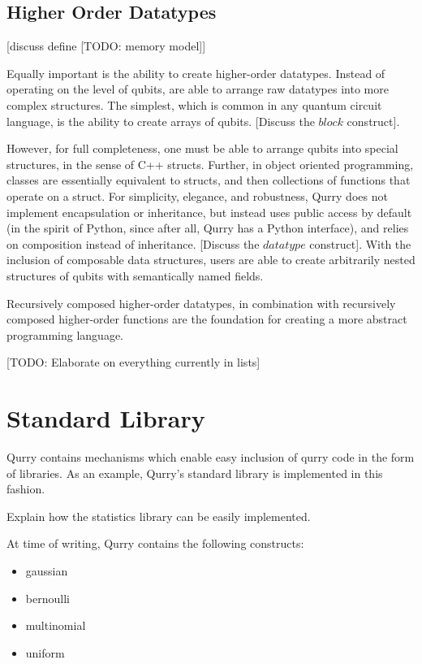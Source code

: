 \documentclass[journal]{IEEEtran}
\begin{document}
    \subsection{Higher Order Datatypes}

    [discuss define [TODO: memory model]]

    Equally important is the ability to create higher-order datatypes.
    Instead of operating on the level of qubits, are able to arrange raw datatypes into more complex structures.
    The simplest, which is common in any quantum circuit language, is the ability to create arrays of qubits.
    [Discuss the $block$ construct].

    However, for full completeness, one must be able to arrange qubits into special structures, in the sense of C++ structs.
    Further, in object oriented programming, classes are essentially equivalent to structs, and then collections of functions that operate on a struct.
    For simplicity, elegance, and robustness, Qurry does not implement encapsulation or inheritance, but instead uses public access by default (in the spirit of Python, since after all, Qurry has a Python interface), and relies on composition instead of inheritance.
    [Discuss the $datatype$ construct].
    With the inclusion of composable data structures, users are able to create arbitrarily nested structures of qubits with semantically named fields.

    Recursively composed higher-order datatypes, in combination with recursively composed higher-order functions are the foundation for creating a more abstract programming language.

    [TODO: Elaborate on everything currently in lists]

\section{Standard Library}

    Qurry contains mechanisms which enable easy inclusion of qurry code in the form of libraries.
    As an example, Qurry's standard library is implemented in this fashion.

    Explain how the statistics library can be easily implemented.

    At time of writing, Qurry contains the following constructs:  	
    \begin{itemize}
	    \item gaussian 	
        \item bernoulli
	    \item multinomial 	
	    \item uniform
    \end{itemize}
\end{document}
